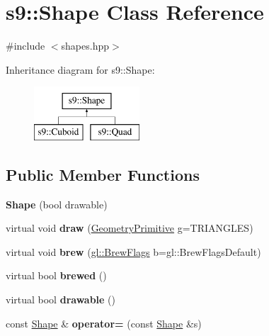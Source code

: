 \hypertarget{classs9_1_1Shape}{\section{s9\-:\-:\-Shape \-Class \-Reference}
\label{classs9_1_1Shape}
}


{\ttfamily \#include $<$shapes.\-hpp$>$}

\-Inheritance diagram for s9\-:\-:\-Shape\-:\begin{figure}[H]
\begin{center}
\leavevmode
\includegraphics[height=2.000000cm]{classs9_1_1Shape}
\end{center}
\end{figure}
\subsection*{\-Public \-Member \-Functions}
\begin{DoxyCompactItemize}
\item 
\hypertarget{classs9_1_1Shape_a10576eb7d1cf65ddca211b45aeed79fa}{{\bfseries \-Shape} (bool drawable)}\label{classs9_1_1Shape_a10576eb7d1cf65ddca211b45aeed79fa}

\item 
\hypertarget{classs9_1_1Shape_ae9ef06c2ced4223d73d089b0a86c1425}{virtual void {\bfseries draw} (\hyperlink{namespaces9_ad57d1332f8fd67d23f6a1d3520ab785c}{\-Geometry\-Primitive} g=\-T\-R\-I\-A\-N\-G\-L\-E\-S)}\label{classs9_1_1Shape_ae9ef06c2ced4223d73d089b0a86c1425}

\item 
\hypertarget{classs9_1_1Shape_a46eee9a8b5e93f0824dbc5a2ab09ef9d}{virtual void {\bfseries brew} (\hyperlink{structs9_1_1gl_1_1BrewFlags}{gl\-::\-Brew\-Flags} b=gl\-::\-Brew\-Flags\-Default)}\label{classs9_1_1Shape_a46eee9a8b5e93f0824dbc5a2ab09ef9d}

\item 
\hypertarget{classs9_1_1Shape_a7a466911ab12c422e97afd09e3dd0477}{virtual bool {\bfseries brewed} ()}\label{classs9_1_1Shape_a7a466911ab12c422e97afd09e3dd0477}

\item 
\hypertarget{classs9_1_1Shape_a16c71939d79069aa8c58d59a069c392c}{virtual bool {\bfseries drawable} ()}\label{classs9_1_1Shape_a16c71939d79069aa8c58d59a069c392c}

\item 
\hypertarget{classs9_1_1Shape_a54e221bed4dbe4ba444a9a64dc53ca04}{const \hyperlink{classs9_1_1Shape}{\-Shape} \& {\bfseries operator=} (const \hyperlink{classs9_1_1Shape}{\-Shape} \&s)}\label{classs9_1_1Shape_a54e221bed4dbe4ba444a9a64dc53ca04}

\end{DoxyCompactItemize}
